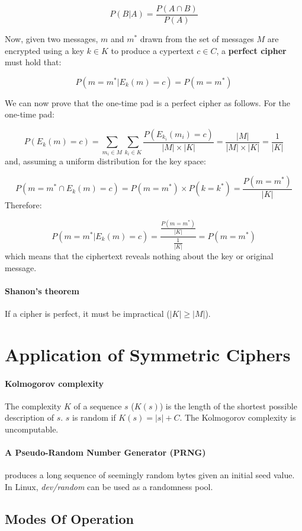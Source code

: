 \documentclass[12pt, letterpaper]{article}
\begin{document}
\[
  P(B|A) = \frac{P(A \cap B)}{P(A)}
\]

Now, given two messages, $m$ and $m^*$ drawn from the set of messages $M$ are encrypted using a key $k \in K$ to produce a cypertext $c \in C$,
a \textbf{perfect cipher} must hold that:

\[
  P \left( m = m^* | E_k \left( m \right) = c \right) = P \left( m = m^* \right)
\]

We can now prove that the one-time pad is a perfect cipher as follows.
For the one-time pad:

\[
  P \left( E_k \left( m \right) = c \right) = \sum_{m_i \in M} \sum_{k_i \in K} \frac{P(E_{k_i} (m_i) = c)}{|M| \times |K|}
  = \frac{|M|}{|M| \times |K|}
  = \frac{1}{|K|}
\]
and, assuming a uniform distribution for the key space:

\[
  P \left( m = m^* \cap E_k(m) = c \right)
  = P(m = m^*) \times P(k = k^*)
  = \frac{P(m = m^*)}{|K|}
\]
Therefore:

\[
  P \left( m = m^* | E_k(m) = c \right) = \frac{\frac{P(m = m^*)}{|K|}}{\frac{1}{|K|}}
  = P(m = m^*)
\]
which means that the ciphertext reveals nothing about the key or original message.

\paragraph{Shanon's theorem} If a cipher is perfect, it must be impractical ($|K| \geq |M|$).


\section{Application of Symmetric Ciphers}

\paragraph{Kolmogorov complexity} The complexity $K$ of a sequence $s$ ($K(s)$) is the length of the shortest possible description of $s$.
$s$ is random if $K(s) = |s| + C$.
The Kolmogorov complexity is uncomputable.

\paragraph{A Pseudo-Random Number Generator (PRNG)} produces a long sequence of seemingly random bytes given an initial seed value.
In Linux, \emph{dev/random} can be used as a randomness pool.

\subsection{Modes Of Operation}
\end{document}
